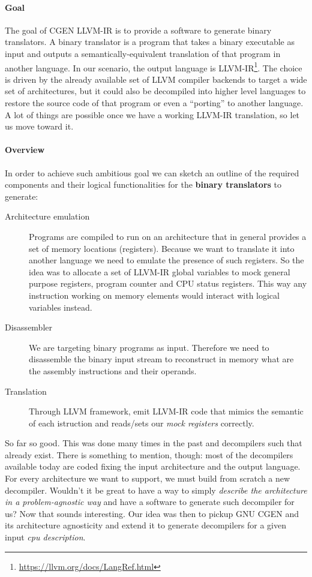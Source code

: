 \documentclass{article}
\begin{document}
\paragraph{Goal}
The goal of CGEN LLVM-IR is to provide a software to generate binary translators. A binary translator is a program that takes a binary executable as input and outputs a semantically-equivalent translation of that program in another language. In our scenario, the output language is LLVM-IR\footnote{\url{https://llvm.org/docs/LangRef.html}}. The choice is driven by the already available set of LLVM compiler backends to target a wide set of architectures, but it could also be decompiled into higher level languages to restore the source code of that program or even a ``porting'' to another language. A lot of things are possible once we have a working LLVM-IR translation, so let us move toward it.

\paragraph{Overview}
In order to achieve such ambitious goal we can sketch an outline of the required components and their logical functionalities for the \textbf{binary translators} to generate:
\begin{description}
\item[Architecture emulation] Programs are compiled to run on an architecture that in general provides a set of memory locations (registers). Because we want to translate it into another language we need to emulate the presence of such registers. So the idea was to allocate a set of LLVM-IR global variables to mock general purpose registers, program counter and CPU status registers. This way any instruction working on memory elements would interact with logical variables instead.
\item[Disassembler] We are targeting binary programs as input. Therefore we need to disassemble the binary input stream to reconstruct in memory what are the assembly instructions and their operands.
\item[Translation] Through LLVM framework, emit LLVM-IR code that mimics the semantic of each istruction and reads/sets our \emph{mock registers} correctly.
\end{description}

So far so good. This was done many times in the past and decompilers such that already exist. There is something to mention, though: most of the decompilers available today are coded fixing the input architecture and the output language. For every architecture we want to support, we must build from scratch a new decompiler. Wouldn't it be great to have a way to simply \emph{describe the architecture in a problem-agnostic way} and have a software to generate such decompiler for us? Now that sounds interesting. Our idea was then to pickup GNU CGEN and its architecture agnosticity and extend it to generate decompilers for a given input \emph{cpu description}.
\end{document}
